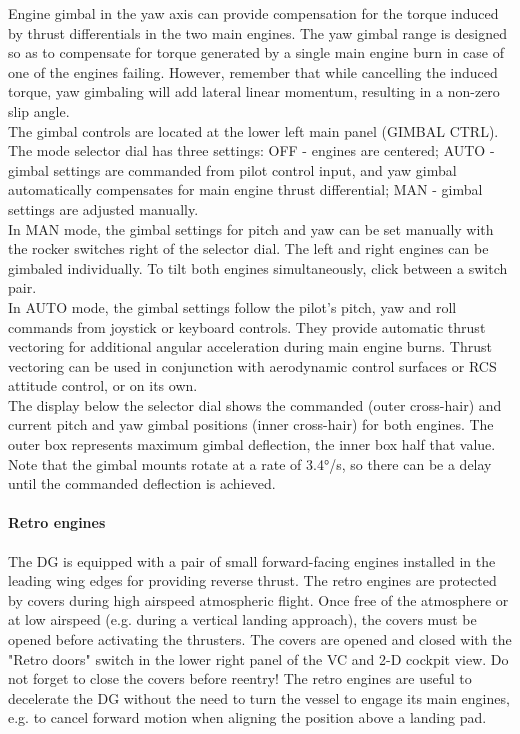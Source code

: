 \documentclass[Orbiter User Manual.tex]{subfiles}
\begin{document}
\noindent
Engine gimbal in the yaw axis can provide compensation for the torque induced by thrust differentials in the two main engines. The yaw gimbal range is designed so as to compensate for torque generated by a single main engine burn in case of one of the engines failing. However, remember that while cancelling the induced torque, yaw gimbaling will add lateral linear momentum, resulting in a non-zero slip angle.\\
The gimbal controls are located at the lower left main panel (GIMBAL CTRL). The mode selector dial has three settings: OFF - engines are centered; AUTO - gimbal settings are commanded from pilot control input, and yaw gimbal automatically compensates for main engine thrust differential; MAN - gimbal settings are adjusted manually.\\
In MAN mode, the gimbal settings for pitch and yaw can be set manually with the rocker switches right of the selector dial. The left and right engines can be gimbaled individually. To tilt both engines simultaneously, click between a switch pair.\\
In AUTO mode, the gimbal settings follow the pilot's pitch, yaw and roll commands from joystick or keyboard controls. They provide automatic thrust vectoring for additional angular acceleration during main engine burns. Thrust vectoring can be used in conjunction with aerodynamic control surfaces or RCS attitude control, or on its own.\\
The display below the selector dial shows the commanded (outer cross-hair) and current pitch and yaw gimbal positions (inner cross-hair) for both engines. The outer box represents maximum gimbal deflection, the inner box half that value. Note that the gimbal mounts rotate at a rate of 3.4°/s, so there can be a delay until the commanded deflection is achieved.

\paragraph{Retro engines}
The DG is equipped with a pair of small forward-facing engines installed in the leading wing edges for providing reverse thrust. The retro engines are protected by covers during high airspeed atmospheric flight. Once free of the atmosphere or at low airspeed (e.g. during a vertical landing approach), the covers must be opened before activating the thrusters. The covers are opened and closed with the "Retro doors" switch in the lower right panel of the VC and 2-D cockpit view. Do not forget to close the covers before reentry! The retro engines are useful to decelerate the DG without the need to turn the vessel to engage its main engines, e.g. to cancel forward motion when aligning the position above a landing pad.
\end{document}
